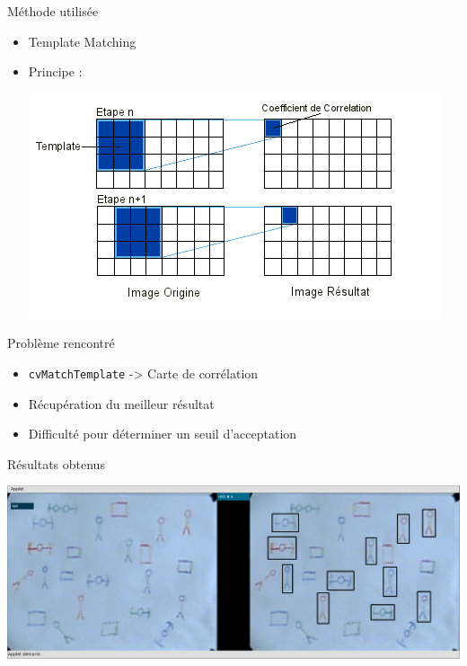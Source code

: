 \documentclass[t,14pt]{beamer}
\begin{document}
\begin{frame}{Méthode utilisée}
\vspace{5mm}
\begin{itemize}
\item Template Matching
\item Principe : 
\begin{center}
\includegraphics[scale=0.66]{images/templateMatching.png}
\end{center}
\end{itemize}
\end{frame}
			
\begin{frame}{Problème rencontré}
\vspace{5mm}
\begin{itemize}
\item \texttt{cvMatchTemplate} -> Carte de corrélation
\item Récupération du meilleur résultat
\item Difficulté pour déterminer un seuil d'acceptation
\end{itemize}
\end{frame}	

\begin{frame}{Résultats obtenus}
\vspace{5mm}
\begin{center}
\includegraphics[width=\textwidth]{images/capture1.png}
\end{center}
\end{frame}
\end{document}
